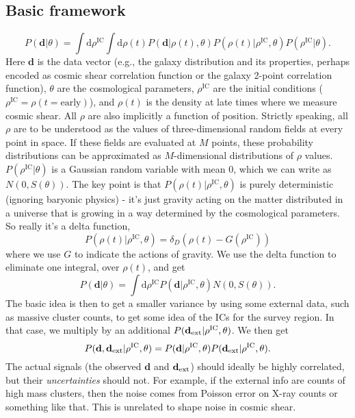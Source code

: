 \documentclass[preprint]{aastex}
\newcommand{\data}{\mathbf{d}}
\newcommand{\dataext}{\data_{\rm ext}}
\begin{document}
\subsection{Basic framework}
\begin{equation}
	P(\data|\theta) = \int \mathrm{d}\rho^\text{IC}\int \mathrm{d}\rho(t) P(\data|\rho(t),\theta)
	P(\rho(t)|\rho^\text{IC},\theta) P(\rho^\text{IC}|\theta).
\end{equation}
Here $\data$ is the data vector (e.g., the galaxy distribution and its properties, perhaps encoded
as cosmic shear correlation function or the galaxy 2-point
correlation function), $\theta$ are the cosmological parameters, $\rho^\text{IC}$ are the initial
conditions ($\rho^\text{IC}=\rho(t=\text{early})$), and $\rho(t)$ is the density at late times where we measure cosmic
shear.  All $\rho$ are also implicitly a function of position. Strictly speaking, all $\rho$ are to be understood as the values of three-dimensional random fields at every point in space. If these fields are evaluated at $M$ points, these probability distributions can be approximated as $M$-dimensional distributions of $\rho$ values. 
$P(\rho^\text{IC}|\theta)$ is a Gaussian random variable with mean $0$, which we can write as $N(0,S(\theta))$.  The key point is that
$P(\rho(t)|\rho^\text{IC},\theta)$ is purely deterministic (ignoring baryonic physics) - it's just
gravity acting on the matter distributed in a universe that is growing in a way determined by the
cosmological parameters.  So really it's a delta function,
\begin{equation}
	P(\rho(t)|\rho^\text{IC},\theta) = \delta_D(\rho(t)-G(\rho^\text{IC}))
\end{equation} 
where we use $G$ to indicate the actions of gravity.  We use the delta function to eliminate one
integral, over $\rho(t)$, and get
\begin{equation}
	P(\data|\theta) = \int \mathrm{d}\rho^\text{IC}  P(\data|\rho^\text{IC},\theta)N(0,S(\theta)).
\end{equation}
The basic idea is then to get a smaller variance by using some external data, such as massive
cluster counts, to get some idea of the ICs for the survey region.  In that case, we multiply by an
additional $P(\dataext|\rho^\text{IC},\theta)$.  We then get
\begin{equation}
	P(\data,\dataext|\rho^\text{IC},\theta) = P(\data|\rho^\text{IC},\theta)P(\dataext|\rho^\text{IC},\theta).
\end{equation}
The actual signals (the observed $\data$ and $\dataext$) should ideally be highly
correlated, but their {\em uncertainties} should not.  For example, if the external info are counts
of high mass clusters, then the noise comes from Poisson error on X-ray counts or something like
that.  This is unrelated to shape noise in cosmic shear.
\end{document}
